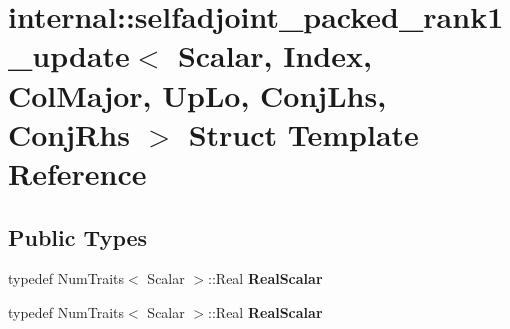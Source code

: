 \hypertarget{structinternal_1_1selfadjoint__packed__rank1__update_3_01_scalar_00_01_index_00_01_col_major_00_cda55a2b2bf1b1755d1ad2703b37584d}{}\section{internal\+:\+:selfadjoint\+\_\+packed\+\_\+rank1\+\_\+update$<$ Scalar, Index, Col\+Major, Up\+Lo, Conj\+Lhs, Conj\+Rhs $>$ Struct Template Reference}
\label{structinternal_1_1selfadjoint__packed__rank1__update_3_01_scalar_00_01_index_00_01_col_major_00_cda55a2b2bf1b1755d1ad2703b37584d}
\subsection*{Public Types}
\begin{DoxyCompactItemize}
\item 
\mbox{\label{structinternal_1_1selfadjoint__packed__rank1__update_3_01_scalar_00_01_index_00_01_col_major_00_cda55a2b2bf1b1755d1ad2703b37584d_a8bcb87c37f6421d0a3d5981f8fe4aa92}} 
typedef Num\+Traits$<$ Scalar $>$\+::Real {\bfseries Real\+Scalar}
\item 
\mbox{\label{structinternal_1_1selfadjoint__packed__rank1__update_3_01_scalar_00_01_index_00_01_col_major_00_cda55a2b2bf1b1755d1ad2703b37584d_a8bcb87c37f6421d0a3d5981f8fe4aa92}} 
typedef Num\+Traits$<$ Scalar $>$\+::Real {\bfseries Real\+Scalar}
\end{DoxyCompactItemize}
